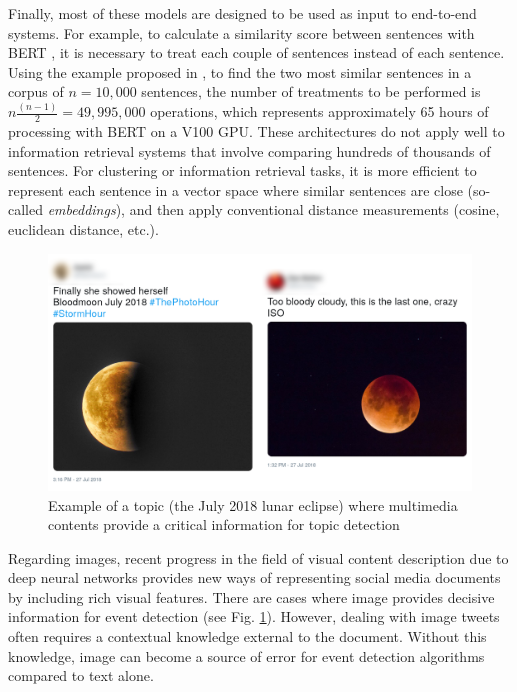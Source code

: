 Finally, most of these models are designed to be used as input to
end-to-end systems. For example, to calculate a similarity score between sentences
with BERT \cite{devlin2018bert}, it is necessary to treat each couple of sentences instead of each sentence. Using the example proposed in \cite{reimers_2019_sentence}, to find the two most similar sentences in a corpus of $n = 10,000$ sentences, the number of treatments to be performed is $n\frac{(n - 1)}{2} = 49,995,000$ operations, which represents approximately 65 hours of processing with BERT on a V100 GPU.
These architectures do not apply well to information retrieval systems that involve comparing
hundreds of thousands of sentences. For clustering or information retrieval tasks, 
it is more efficient to represent each sentence in a vector space where similar sentences
 are close (so-called \textit{embeddings}), and then apply conventional distance measurements 
 (cosine, euclidean distance, etc.).
 
 \begin{figure}
  \includegraphics[width=\textwidth]{figures/Moon_horizontal.png}
    \caption{Example of a topic (the July 2018 lunar eclipse) where multimedia contents provide a critical information for topic detection}
    \label{fig:moon}
\end{figure}
 
 Regarding images, recent progress in the field of visual content description due to deep neural networks provides new ways of representing social media documents by including rich visual features. There are cases where image provides decisive information for event detection (see Fig. \ref{fig:moon}). However, dealing with image tweets often requires a contextual knowledge external to the document. Without this knowledge, image can become a source of error for event detection algorithms compared to text alone.
 
